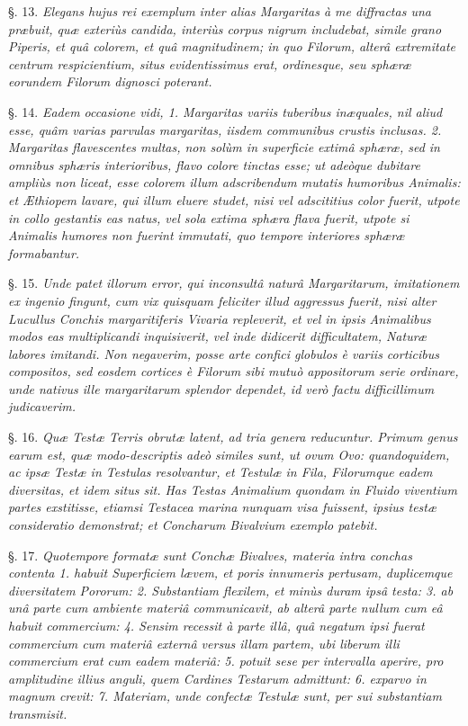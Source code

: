 \documentclass[a4paper, 11pt, oneside, polutonikogreek, german]{article}
\begin{document}
§. 13. \emph{Elegans hujus rei exemplum inter alias Margaritas à me diffractas una præbuit, quæ exteriùs candida, interiùs corpus nigrum includebat, simile grano Piperis, et quâ colorem, et quâ magnitudinem; in quo Filorum, alterâ extremitate centrum respicientium, situs evidentissimus erat, ordinesque, seu sphæræ eorundem Filorum dignosci poterant.}

§. 14. \emph{Eadem occasione vidi, 1. Margaritas variis tuberibus inæquales, nil aliud esse, quâm varias parvulas margaritas, iisdem communibus crustis inclusas. 2. Margaritas flavescentes multas, non solùm in superficie extimâ sphæræ, sed in omnibus sphæris interioribus, flavo colore tinctas esse; ut adeòque dubitare ampliùs non liceat, esse colorem illum adscribendum mutatis humoribus Animalis: et Æthiopem lavare, qui illum eluere studet, nisi vel adscititius color fuerit, utpote in collo gestantis eas natus, vel sola extima sphæra flava fuerit, utpote si Animalis humores non fuerint immutati, quo tempore interiores sphæræ formabantur.}

§. 15. \emph{Unde patet illorum error, qui inconsultâ naturâ Margaritarum, imitationem ex ingenio fingunt, cum vix quisquam feliciter illud aggressus fuerit, nisi alter Lucullus Conchis margaritiferis Vivaria repleverit, et vel in ipsis Animalibus modos eas multiplicandi inquisiverit, vel inde didicerit difficultatem, Naturæ labores imitandi. Non negaverim, posse arte confici globulos è variis corticibus compositos, sed eosdem cortices è Filorum sibi mutuò appositorum serie ordinare, unde nativus ille margaritarum splendor dependet, id verò factu difficillimum judicaverim.}

§. 16. \emph{Quæ Testæ Terris obrutæ latent, ad tria genera reducuntur. Primum genus earum est, quæ modo-descriptis adeò similes sunt, ut ovum Ovo: quandoquidem, ac ipsæ Testæ in Testulas resolvantur, et Testulæ in Fila, Filorumque eadem diversitas, et idem situs sit. Has Testas Animalium quondam in Fluido viventium partes exstitisse, etiamsi Testacea marina nunquam visa fuissent, ipsius testæ consideratio demonstrat; et Concharum Bivalvium exemplo patebit.}

§. 17. \emph{Quotempore formatæ sunt Conchæ Bivalves, materia intra conchas contenta 1. habuit Superficiem lævem, et poris innumeris pertusam, duplicemque diversitatem Pororum: 2. Substantiam flexilem, et minùs duram ipsâ testa: 3. ab unâ parte cum ambiente materiâ communicavit, ab alterâ parte nullum cum eâ habuit commercium: 4. Sensim recessit à parte illâ, quâ negatum ipsi fuerat commercium cum materiâ externâ versus illam partem, ubi liberum illi commercium erat cum eadem materiâ: 5. potuit sese per intervalla aperire, pro amplitudine illius anguli, quem Cardines Testarum admittunt: 6. exparvo in magnum crevit: 7. Materiam, unde confectæ Testulæ sunt, per sui substantiam transmisit.}
\end{document}
